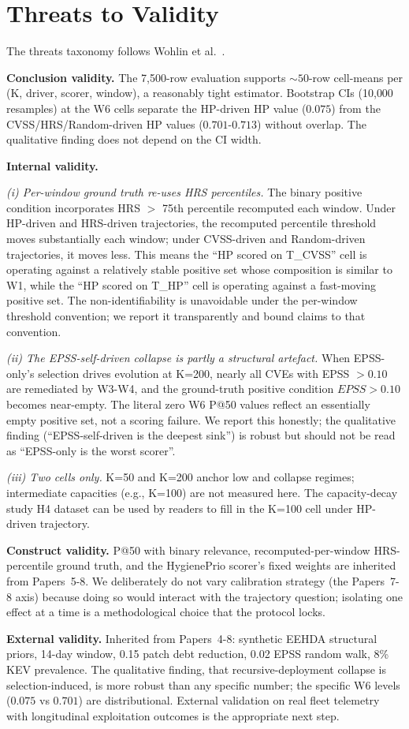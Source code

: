 \section{Threats to Validity}
\label{sec:threats}

The threats taxonomy follows Wohlin et al.~\cite{wohlin2012experimentation}.

\textbf{Conclusion validity.} The 7{,}500-row evaluation supports
$\sim 50$-row cell-means per (K, driver, scorer, window), a
reasonably tight estimator. Bootstrap CIs (10{,}000 resamples) at
the W6 cells separate the HP-driven HP value ($0.075$) from the
CVSS/HRS/Random-driven HP values ($0.701$-$0.713$) without overlap.
The qualitative finding does not depend on the CI width.

\textbf{Internal validity.}

\textit{(i) Per-window ground truth re-uses HRS percentiles.} The
binary positive condition incorporates HRS $>$ 75th percentile
recomputed each window. Under HP-driven and HRS-driven trajectories,
the recomputed percentile threshold moves substantially each window;
under CVSS-driven and Random-driven trajectories, it moves less.
This means the ``HP scored on T\_CVSS'' cell is operating against a
relatively stable positive set whose composition is similar to W1,
while the ``HP scored on T\_HP'' cell is operating against a
fast-moving positive set. The non-identifiability is unavoidable
under the per-window threshold convention; we report it transparently
and bound claims to that convention.

\textit{(ii) The EPSS-self-driven collapse is partly a structural
artefact.} When EPSS-only's selection drives evolution at K=200,
nearly all CVEs with EPSS $> 0.10$ are remediated by W3-W4, and the
ground-truth positive condition $EPSS > 0.10$ becomes near-empty.
The literal zero W6 P@50 values reflect an essentially empty positive
set, not a scoring failure. We report this honestly; the qualitative
finding (``EPSS-self-driven is the deepest sink'') is robust but
should not be read as ``EPSS-only is the worst scorer''.

\textit{(iii) Two cells only.} K=50 and K=200 anchor low and
collapse regimes; intermediate capacities (e.g., K=100) are not
measured here. The capacity-decay study H4 dataset can be used by readers to
fill in the K=100 cell under HP-driven trajectory.

\textbf{Construct validity.} P@50 with binary relevance, recomputed-per-window
HRS-percentile ground truth, and the HygienePrio scorer's fixed weights are
inherited from Papers~5-8. We deliberately do not vary calibration
strategy (the Papers~7-8 axis) because doing so would interact with
the trajectory question; isolating one effect at a time is a
methodological choice that the protocol locks.

\textbf{External validity.} Inherited from Papers~4-8: synthetic
EEHDA structural priors, 14-day window, 0.15 patch debt reduction,
0.02 EPSS random walk, 8\% KEV prevalence. The qualitative finding, 
that recursive-deployment collapse is selection-induced, is more
robust than any specific number; the specific W6 levels ($0.075$ vs
$0.701$) are distributional. External validation on real fleet
telemetry with longitudinal exploitation outcomes is the appropriate
next step.
